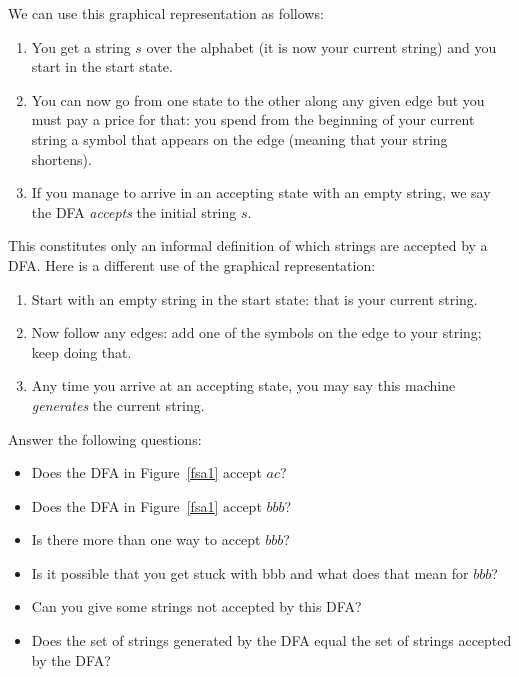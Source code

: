 We can use this graphical representation as follows:

\begin{enumerate}
\item You get a string $s$ over the alphabet (it is now your current
  string) and you start in the start state.\vspace{-0.5em}
\item You can now go from one state to the other along any given
  edge but you must pay a price for that: you spend from the beginning
  of your current string a symbol that appears on the edge (meaning
  that your string shortens).\vspace{-0.5em}
\item If you manage to arrive in an accepting state with an empty string,
  we say the DFA \emph{accepts} the initial string $s$.
\end{enumerate}

This constitutes only an informal definition of which strings are
accepted by a DFA. Here is a different use of the graphical representation:

\begin{enumerate}
\item Start with an empty string in the start state: that is your
  current string.\vspace{-0.5em}
\item Now follow any edges: add one of the symbols on the edge to your string; keep doing that.\vspace{-0.5em}
\item Any time you arrive at an accepting state, you may say this machine \emph{generates} the current string.
\end{enumerate}

\begin{exercise}
Answer the following questions:

\begin{itemize}
\item Does the DFA in Figure~\ref{fsa1} accept $ac$?

\item Does the DFA in Figure~\ref{fsa1} accept $bbb$?

\item Is there more than one way to accept $bbb$?

\item Is it possible that you get stuck with bbb and what does that mean for $bbb$?

\item Can you give some strings not accepted by this DFA?


\item Does the set of strings generated by the DFA equal the set of strings accepted by the DFA?
\end{itemize}
\end{exercise}

